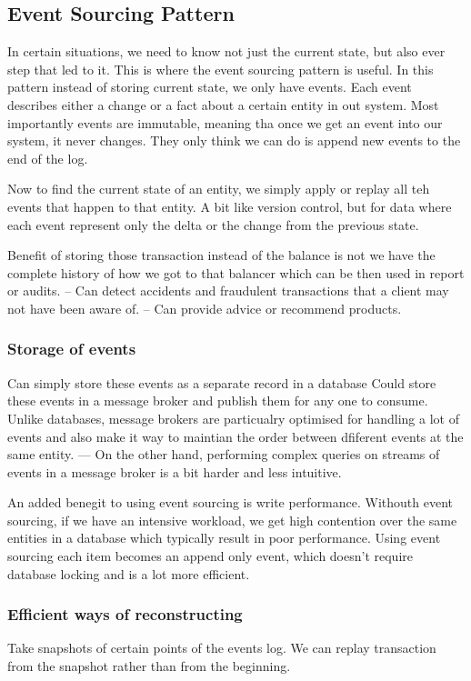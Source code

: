 \documentclass[a4paper, 11pt]{book}
\begin{document}
    \subsection{Event Sourcing Pattern}
    In certain situations, we need to know not just the current state, but also ever step that led to it.
    This is where the event sourcing pattern is useful.
    In this pattern instead of storing current state, we only have events.
    Each event describes either a change or a fact about a certain entity in out system.
    Most importantly events are immutable, meaning tha once we get an event into our system, it never changes.
    They only think we can do is append new events to the end of the log.

    Now to find the current state of an entity, we simply apply or replay all teh events that happen to that entity.
    A bit like version control, but for data where each event represent only the delta or the change from the previous state.

    Benefit of storing those transaction instead of the balance is not we have the complete history of how we got to that balancer which can be then used in report or audits.
    -- Can detect accidents and fraudulent transactions that a client may not have been aware of.
    -- Can provide advice or recommend products.

    \subsubsection{Storage of events}
    Can simply store these events as a separate record in a database
    Could store these events in a message broker and publish them for any one to consume.
    Unlike databases, message brokers are particualry optimised for handling a lot of events and also make it way to maintian the order between dfiferent events at the same entity.
    --- On the other hand, performing complex queries on streams of events in a message broker is a bit harder and less intuitive.

    An added benegit to using event sourcing is write performance.
    Withouth event sourcing, if we have an intensive workload, we get high contention over the same entities in a database which typically result in poor performance.
    Using event sourcing each item becomes an append only event, which doesn't require database locking and is a lot more efficient.

    \subsubsection{Efficient ways of reconstructing}
    Take snapshots of certain points of the events log.
    We can replay transaction from the snapshot rather than from the beginning.
\end{document}
